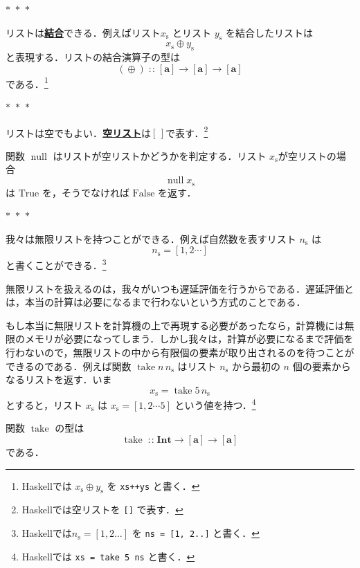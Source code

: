 \documentclass[a5paper,twoside,fleqn,draft]{jsbook}
\newcommand{\separator}{\begin{center}$*$~$*$~$*$\end{center}}
\newcommand{\programminglanguage}[1]{\textsf{#1}}
\newcommand{\haskell}{\programminglanguage{Haskell}}
\newcommand{\keyword}[1]{{\underline{\textbf{#1}}}}
\newcommand{\code}[1]{\texttt{#1}}
\newcommand{\mSpecialConstant}[1]{\textrm{#1}}
\newcommand{\mEmptyList}{{[\,]}}
\newcommand{\mFalse}{\mSpecialConstant{False}}
\newcommand{\mTrue}{\mSpecialConstant{True}}
\newcommand{\mSpecialFunc}[1]{\mathrm{#1}}
\DeclareMathOperator{\mNull}{\mSpecialFunc{null}}
\DeclareMathOperator{\mTake}{\mSpecialFunc{take}}
\DeclareMathOperator{\mAppend}{\oplus}
\DeclareMathOperator{\mFuncArrow}{\rightarrow}
\DeclareMathOperator{\mIn}{{:\!:}}
\newcommand{\mType}[1]{\mathbf{#1}} %
\newcommand{\mA}{\mType{a}}
\newcommand{\mIntType}{\mType{Int}}
\newcommand{\mTupleWith}[1]{\left(#1\right)}
\newcommand{\mList}[1]{{#1}_\mathrm{s}}
\begin{document}

\separator

リストは\keyword{結合}できる．例えばリスト$\mList{x}$ とリスト
$\mList{y}$ を結合したリストは
\begin{equation}
  \mList{x}\mAppend\mList{y}
\end{equation}
と表現する．リストの結合演算子の型は
\begin{equation}
  (\mAppend)
  \mIn[\mA]\mFuncArrow[\mA]\mFuncArrow[\mA]
\end{equation}
である．\footnote{\haskell では $\mList{x}\mAppend\mList{y}$ を \code{xs++ys} と書く．}

\separator

リストは空でもよい．\keyword{空リスト}は$\mEmptyList$で表す．\footnote{\haskell では空リストを \code{[]} で表す．}

関数 $\mNull$ はリストが空リストかどうかを判定する．リスト $\mList{x}$が空リストの場合
\begin{equation}
  \mNull\mList{x}
\end{equation}
は $\mTrue$ を，そうでなければ $\mFalse$ を返す．

\separator

我々は無限リストを持つことができる．例えば自然数を表すリスト
$\mList{n}$ は
\begin{equation*}
  \mList{n}
  =[1,2\dotsb]
\end{equation*}
と書くことができる．\footnote{\haskell では$\mList{n}=[1,2\dots]$ を \code{ns = [1, 2..]} と書く．}

無限リストを扱えるのは，我々がいつも遅延評価を行うからである．遅延評価とは，本当の計算は必要になるまで行わないという方式のことである．

もし本当に無限リストを計算機の上で再現する必要があったなら，計算機には無限のメモリが必要になってしまう．しかし我々は，計算が必要になるまで評価を行わないので，無限リストの中から有限個の要素が取り出されるのを待つことができるのである．例えば関数 $\mTake n\,\mList{n}$ はリスト $\mList{n}$ から最初の $n$ 個の要素からなるリストを返す．いま
\begin{equation*}
  \mList{x}
  =\mTake5\,\mList{n}
\end{equation*}
とすると，リスト $\mList{x}$ は $\mList{x}=[1,2\dotsb5]$ という値を持つ．\footnote{\haskell では \code{xs = take 5 ns} と書く．}

関数 $\mTake$ の型は
\begin{equation}
  \mTake
  \mIn\mIntType\mFuncArrow[\mA]\mFuncArrow[\mA]
\end{equation}
である．
\end{document}
